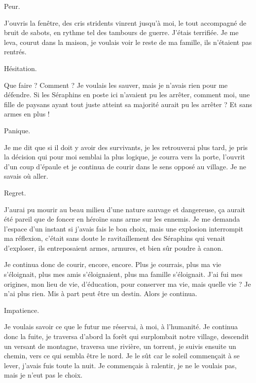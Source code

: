 \documentclass{book}
\begin{document}
Peur.\newline

J'ouvris la fenêtre, des cris stridents vinrent jusqu'à moi, le tout accompagné de bruit de sabots, en rythme tel des tambours de guerre. J'étais terrifiée. Je me leva, courut dans la maison, je voulais voir le reste de ma famille, ils n'étaient pas rentrés.\newline

Hésitation.\newline

Que faire ? Comment ? Je voulais les sauver, mais je n'avais rien pour me défendre. Si les Séraphins en poste ici n'avaient pu les arrêter, comment moi, une fille de paysans ayant tout juste atteint sa majorité aurait pu les arrêter ? Et sans armes en plus !\newline

Panique.\newline

Je me dit que si il doit y avoir des survivants, je les retrouverai plus tard, je pris la décision qui pour moi semblai la plus logique, je courra vers la porte, l'ouvrit d'un coup d'épaule et je continua de courir dans le sens opposé au village. Je ne savais où aller.\newline

Regret.\newline

J'aurai pu mourir au beau milieu d'une nature sauvage et dangereuse, ça aurait été pareil que de foncer en héroïne sans arme sur les ennemis. Je me demanda l'espace d'un instant si j'avais fais le bon choix, mais une explosion interrompit ma réflexion, c'était sans doute le ravitaillement des Séraphins qui venait d'exploser, ils entreposaient armes, armures, et bien sûr poudre à canon.\newline

Je continua donc de courir, encore, encore. Plus je courrais, plus ma vie s'éloignait, plus mes amis s'éloignaient, plus ma famille s'éloignait. J'ai fui mes origines, mon lieu de vie, d'éducation, pour conserver ma vie, mais quelle vie ? Je n'ai plus rien. Mis à part peut être un destin. Alors je continua.\newline

Impatience.\newline

Je voulais savoir ce que le futur me réservai, à moi, à l'humanité. Je continua donc la fuite, je traversa d'abord la forêt qui surplombait notre village, descendit un versant de montagne, traversa une rivière, un torrent, je suivis ensuite un chemin, vers ce qui sembla être le nord. Je le sût car le soleil commençait à se lever, j'avais fuis toute la nuit. Je commençais à ralentir, je ne le voulais pas, mais je n'eut pas le choix.\newline
\end{document}
